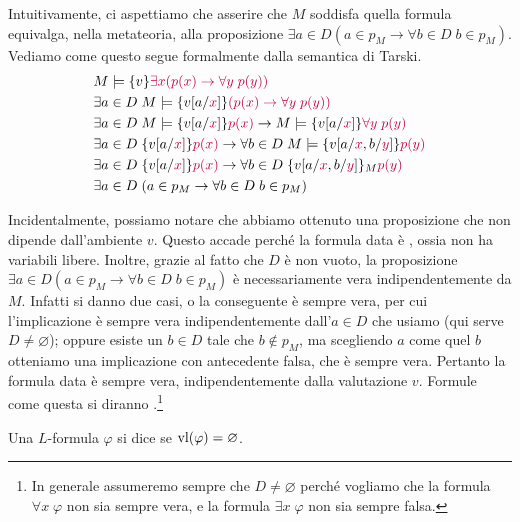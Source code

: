\begin{soln}
    Intuitivamente, ci aspettiamo che asserire che $M$ soddisfa quella formula equivalga, nella metateoria, alla proposizione $\exists a \in D(a \in p_M \to \forall b \in D \; b \in p_M)$.
    Vediamo come questo segue formalmente dalla semantica di Tarski.
    \begin{align*}
        & M \models \{v\} \textcolor{purple}{\exists x(p(x) \to \forall y \; p(y))} \\
        & \exists a \in D \; M \models \{v[a/\textcolor{purple}{x}]\} \textcolor{purple}{(p(x) \to \forall y \; p(y))} \\
        & \exists a \in D \; M \models \{v[a/\textcolor{purple}{x}]\} \textcolor{purple}{p(x)} \to M \models \{v[a/\textcolor{purple}{x}]\} \textcolor{purple}{\forall y \; p(y)} \\
        & \exists a \in D \; \{v[a/\textcolor{purple}{x}]\} \textcolor{purple}{p(x)} \to \forall b \in D \; M \models \{v[a/\textcolor{purple}{x},b/\textcolor{purple}{y}]\} \textcolor{purple}{p(y)} \\
        & \exists a \in D \; \{v[a/\textcolor{purple}{x}]\} \textcolor{purple}{p(x)} \to \forall b \in D \; \{v[a/\textcolor{purple}{x},b/\textcolor{purple}{y}]\}_M \textcolor{purple}{p(y)} \\
        & \exists a \in D \; (a \in p_M \to \forall b \in D \; b \in p_M)
    \end{align*}
\end{soln}

Incidentalmente, possiamo notare che abbiamo ottenuto una proposizione che non dipende dall'ambiente $v$. Questo accade perché la formula data è , ossia non ha variabili libere. Inoltre, grazie al fatto che $D$ è non vuoto,
la proposizione $\exists a \in D(a \in p_M \to \forall b \in D \; b \in p_M)$ è necessariamente vera indipendentemente da $M$. Infatti si danno due casi, o la conseguente è sempre vera, per cui l'implicazione è sempre vera indipendentemente dall'$a \in D$ che usiamo (qui serve $D \ne \varnothing$);
oppure esiste un $b \in D$ tale che $b \notin p_M$, ma scegliendo $a$ come quel $b$ otteniamo una implicazione con antecedente falsa, che è sempre vera. Pertanto la formula data è sempre vera, indipendentemente dalla valutazione $v$. Formule come questa si diranno .\footnote{In generale assumeremo sempre che $D \ne \varnothing$ perché vogliamo che la formula $\forall x \; \varphi$ non sia sempre vera, e la formula $\exists x \; \varphi$ non sia sempre falsa.}

\begin{definition}
    Una $L$-formula $\varphi$ si dice  se $\operatorname{vl}(\varphi) = \varnothing$.
\end{definition}

